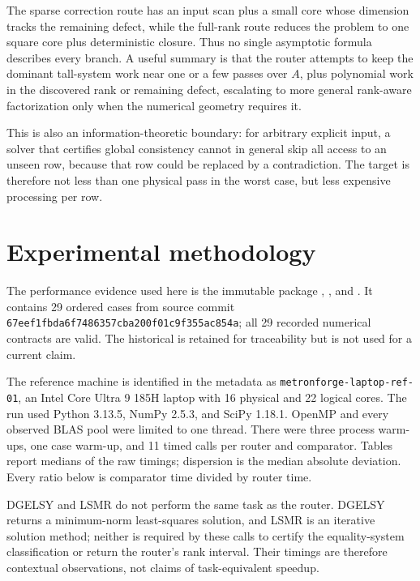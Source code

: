 \documentclass[11pt]{article}
\theoremstyle{definition}
\begin{document}
The sparse correction route has an input scan plus a small core whose dimension tracks the remaining defect, while the full-rank route reduces the problem to one square core plus deterministic closure. Thus no single asymptotic formula describes every branch. A useful summary is that the router attempts to keep the dominant tall-system work near one or a few passes over \(A\), plus polynomial work in the discovered rank or remaining defect, escalating to more general rank-aware factorization only when the numerical geometry requires it.

This is also an information-theoretic boundary: for arbitrary explicit input, a solver that certifies global consistency cannot in general skip all access to an unseen row, because that row could be replaced by a contradiction. The target is therefore not less than one physical pass in the worst case, but less expensive processing per row.

\section{Experimental methodology}\label{sec:experiments}
The performance evidence used here is the immutable package
,
, and
. It contains 29 ordered cases from
source commit \texttt{67eef1fbda6f7486357cba200f01c9f355ac854a};
all 29 recorded numerical contracts are valid. The historical
 is retained for traceability but is not used for
a current claim.

The reference machine is identified in the metadata as
\texttt{metronforge-laptop-ref-01}, an Intel Core Ultra 9 185H laptop with 16
physical and 22 logical cores. The run used Python 3.13.5, NumPy 2.5.3, and
SciPy 1.18.1. OpenMP and every observed BLAS pool were limited to one thread.
There were three process warm-ups, one case warm-up, and 11 timed calls per
router and comparator. Tables report medians of the raw timings; dispersion is
the median absolute deviation. Every ratio below is comparator time divided by
router time.

DGELSY and LSMR do not perform the same task as the router. DGELSY returns a
minimum-norm least-squares solution, and LSMR is an iterative solution method;
neither is required by these calls to certify the equality-system
classification or return the router's rank interval. Their timings are
therefore contextual observations, not claims of task-equivalent speedup.
\end{document}
